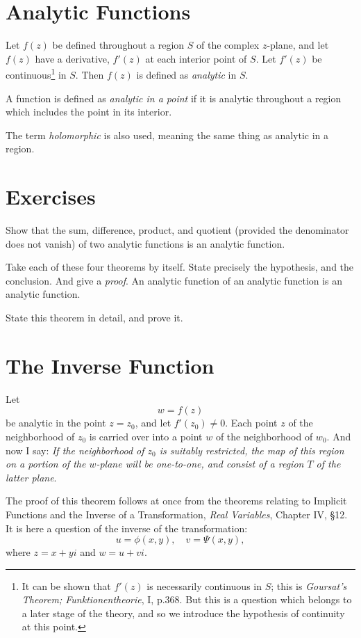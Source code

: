 \documentclass[twosided]{memoir}
\begin{document}
\section{Analytic Functions}
Let $f(z)$ be defined throughout a region $S$ of the complex $z$-plane, and let $f(z)$ have a derivative, $f'(z)$ at each interior point of $S$. Let $f'(z)$ be continuous\footnote{It can be shown that $f'(z)$ is necessarily continuous in $S$; this is \emph{Goursat's Theorem; Funktionentheorie}, I, p.368. But this is a question which belongs to a later stage of the theory, and so we introduce the hypothesis of continuity at this point.} in $S$. Then $f(z)$ is defined as \emph{analytic} in $S$. 

A function is defined as \emph{analytic in a point} if it is analytic throughout a region which includes the point in its interior. 

The term \emph{holomorphic} is also used, meaning the same thing as analytic in a region.

\section*{Exercises}
\problem Show that the sum, difference, product, and quotient (provided the denominator does not vanish) of two analytic functions is an analytic function. 

Take each of these four theorems by itself. State precisely the hypothesis, and the conclusion. And give a \emph{proof}. 
\problem An analytic function of an analytic function is an analytic function.

State this theorem in detail, and prove it.

\section{The Inverse Function}
Let
\[
	w=f(z)
\] be analytic in the point $z=z_0$, and let $f'(z_0)\neq 0$. Each point $z$ of the neighborhood of $z_0$ is carried over into a point $w $ of the neighborhood of $w_0$. And now I say: \emph{If the neighborhood of $z_0$ is suitably restricted, the map of this region on a portion of the $w$-plane will be one-to-one, and consist of a region $T$ of the latter plane}. 

The proof of this theorem follows at once from the theorems relating to Implicit Functions and the Inverse of a Transformation, \emph{Real Variables}, Chapter IV, \S 12. It is here a question of the inverse of the transformation:
\[
	u=\phi (x,y), \quad v=\Psi(x,y)
,\] where $z=x+yi$ and $w=u+vi$. 
\end{document}
